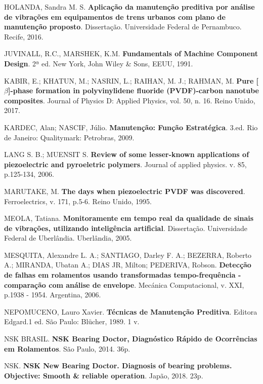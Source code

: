 \documentclass[
	12pt,				
	oneside,			
	a4paper,			
	english,			
	brazil,			
	]{abntex2ppgsi}
\begin{document}
\begin{thebibliography}{9}
  HOLANDA, Sandra M. S.
  \textbf{Aplicação da manutenção preditiva por análise de vibrações em equipamentos de trens urbanos com plano de manutenção proposto}.
  Dissertação. Universidade Federal de Pernambuco. Recife, 2016.

  JUVINALL, R.C., MARSHEK, K.M.
  \textbf{Fundamentals of Machine Component Design}.
  2ª ed. New York, John Wiley \& Sons, EEUU, 1991.

  KABIR, E.; KHATUN, M.; NASRIN, L.; RAIHAN, M. J.; RAHMAN, M.
  \textbf{Pure [$ \beta $]-phase formation in polyvinylidene fluoride (PVDF)-carbon nanotube composites}.
  Journal of Physics D: Applied Physics, vol. 50, n. 16. Reino Unido, 2017.

  KARDEC, Alan; NASCIF, Júlio.
  \textbf{Manutenção: Função Estratégica}.
  3.ed. Rio de Janeiro: Qualitymark: Petrobras, 2009.

  LANG S. B.; MUENSIT S.
  \textbf{Review of some lesser-known applications of piezoelectric and pyroeletric polymers}.
  Journal of applied physics. v. 85, p.125-134, 2006.

  MARUTAKE, M.
  \textbf{The days when piezoelectric PVDF was discovered}.
  Ferroelectrics, v. 171, p.5-6. Reino Unido, 1995.

  MEOLA, Tatiana.
  \textbf{Monitoramente em tempo real da qualidade de sinais de vibrações, utilizando inteligência artificial}.
  Dissertação. Universidade Federal de Uberlândia. Uberlândia, 2005.

  MESQUITA, Alexandre L. A.; SANTIAGO, Darley F. A.; BEZERRA, Roberto A.; MIRANDA, Ubatan A.; 
DIAS JR, Milton; PEDERIVA, Robson.
  \textbf{Detecção de falhas em rolamentos usando transformadas tempo-frequência - comparação com análise de envelope}.
  Mecánica Computacional, v. XXI, p.1938 - 1954. Argentina, 2006.

 NEPOMUCENO, Lauro Xavier.
  \textbf{Técnicas de Manutenção Preditiva}.
  Editora Edgard.1 ed. São Paulo: Blücher, 1989. 1 v.

 NSK BRASIL.
  \textbf{NSK Bearing Doctor, Diagnóstico Rápido de Ocorrências em Rolamentos}.
  São Paulo, 2014. 36p.
  
 NSK.
  \textbf{NSK New Bearing Doctor. Diagnosis of bearing problems. Objective: Smooth \& reliable operation}.
  Japão, 2018. 23p.
 

\end{thebibliography}
\end{document}

